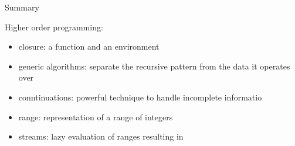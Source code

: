 \begin{frame}{Summary}

\pause Higher order programming:

\begin{itemize}
\pause\item {closure}: a function and an environment
\pause\item {generic algorithms}: separate the recursive pattern from the data it operates over
\pause\item {conntinuations}: powerful technique to handle incomplete informatio
\pause\item {range}: representation of a range of integers
\pause\item {streams}: lazy evaluation of ranges resulting in 
\end{itemize}


\end{frame}






